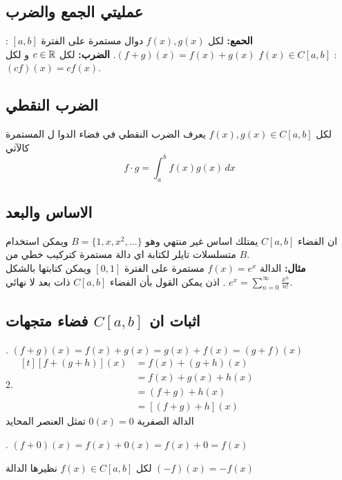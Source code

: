 \subsection{عمليتي الجمع والضرب}
\textbf{الحمع:} لكل $f(x), g(x) $ دوال مستمرة على الفترة $[a, b]$ :$(f+g)(x) = f(x) + g(x)$.
\textbf{الضرب:} لكل $c\in\mathbb{R}$ و لكل $f(x)\in C[a, b]$ : $(cf)(x) = cf(x)$.

\subsection{الضرب النقطي}
لكل $f(x), g(x) \in C[a, b]$ يعرف الضرب النقطي في فضاء الدوا ل المستمرة كالآتي
\[
f\cdot g = \int_{a}^{b} f(x) g(x) \, dx
 \]
 \subsection{الاساس والبعد}
 ان الفضاء $C[a, b]$ يمتلك اساس غير منتهي وهو $B=\{1,x,x^2,\dots\}$ ويمكن استخدام متسلسلات تايلر لكتابة اي دالة مستمرة كتركيب خطي من $B$.\\
 \textbf{مثال:} الدالة $f(x) = e^x$ مستمرة على الفترة $[0,1]$ ويمكن كتابتها بالشكل
 $
 e^x = \sum_{n=0}^{\infty} \frac{x^n}{n!}
$
 . اذن يمكن القول بأن الفضاء $C[a, b]$ ذات بعد لا نهائي.
 
 \subsection{اثبات ان $C[a, b]$ فضاء متجهات}
 
 . $(f+g)(x) = f(x) + g(x) = g(x) + f(x) = (g+f)(x)$\\
 2. $
 \begin{aligned}[t]
 	[f+(g+h)](x) &= f(x) + (g+h)(x)\\
 	&= f(x) + g(x) + h(x) \\
 	&= (f+g) + h(x)\\
 	&= [(f+g)+h](x)
 \end{aligned}
 $\\
 
 \noindent
 الدالة الصفرية $0(x)=0 $ تمثل العنصر المحايد 
 
 . $(f+0)(x) = f(x) + 0(x) = f(x) + 0 = f(x)$
 
 \noindent
 لكل $f(x)\in C[a, b]$ نظيرها  الدالة $(-f)(x) = -f(x)$ 
 
